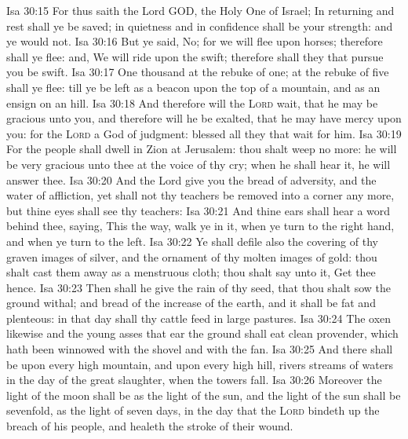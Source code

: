 \vs Isa 30:15 For thus saith the Lord GOD, the Holy One of Israel; In returning and rest shall ye be saved; in quietness and in confidence shall be your strength: and ye would not.
\vs Isa 30:16 But ye said, No; for we will flee upon horses; therefore shall ye flee: and, We will ride upon the swift; therefore shall they that pursue you be swift.
\vs Isa 30:17 One thousand  at the rebuke of one; at the rebuke of five shall ye flee: till ye be left as a beacon upon the top of a mountain, and as an ensign on an hill.
\vs Isa 30:18 And therefore will the \textsc{Lord} wait, that he may be gracious unto you, and therefore will he be exalted, that he may have mercy upon you: for the \textsc{Lord}  a God of judgment: blessed  all they that wait for him.
\vs Isa 30:19 For the people shall dwell in Zion at Jerusalem: thou shalt weep no more: he will be very gracious unto thee at the voice of thy cry; when he shall hear it, he will answer thee.
\vs Isa 30:20 And  the Lord give you the bread of adversity, and the water of affliction, yet shall not thy teachers be removed into a corner any more, but thine eyes shall see thy teachers:
\vs Isa 30:21 And thine ears shall hear a word behind thee, saying, This  the way, walk ye in it, when ye turn to the right hand, and when ye turn to the left.
\vs Isa 30:22 Ye shall defile also the covering of thy graven images of silver, and the ornament of thy molten images of gold: thou shalt cast them away as a menstruous cloth; thou shalt say unto it, Get thee hence.
\vs Isa 30:23 Then shall he give the rain of thy seed, that thou shalt sow the ground withal; and bread of the increase of the earth, and it shall be fat and plenteous: in that day shall thy cattle feed in large pastures.
\vs Isa 30:24 The oxen likewise and the young asses that ear the ground shall eat clean provender, which hath been winnowed with the shovel and with the fan.
\vs Isa 30:25 And there shall be upon every high mountain, and upon every high hill, rivers  streams of waters in the day of the great slaughter, when the towers fall.
\vs Isa 30:26 Moreover the light of the moon shall be as the light of the sun, and the light of the sun shall be sevenfold, as the light of seven days, in the day that the \textsc{Lord} bindeth up the breach of his people, and healeth the stroke of their wound.
